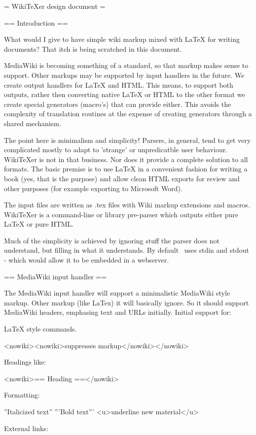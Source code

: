 = WikiTeXer design document =

== Introduction ==

What would I give to have simple wiki markup mixed with LaTeX for
writing documents? That itch is being scratched in this document. 

MediaWiki is becoming something of a standard, so that markup makes
sense to support. Other markups may be supported by input handlers in
the future. We create output handlers for LaTeX and HTML. This means,
to support both outputs, rather then converting native LaTeX or HTML
to the other format we create special generators (macro's) that can
provide either. This avoids the complexity of translation routines at the
expense of creating generators through a shared mechanism.

The point here is minimalism and simplicity! Parsers, in general, tend
to get very complicated mostly to adapt to 'strange' or unpredicatble
user behaviour. WikiTeXer is not in that business. Nor does it provide
a complete solution to all formats. The basic premise is to use LaTeX
in a convenient fashion for writing a book (yes, that is the purpose)
and allow clean HTML exports for review and other purposes (for
example exporting to Microsoft Word).

The input files are written as .tex files with Wiki markup extensions
and macros. WikiTeXer is a command-line or library pre-parser which
outputs either pure LaTeX or pure HTML.

Much of the simplicity is achieved by ignoring stuff the parser does
not understand, but filling in what it understands. By default
\wikitexer\ uses stdin and stdout - which would allow it to be
embedded in a webserver.


== MediaWiki input handler ==

The MediaWiki input handler will support a minimalistic MediaWiki style 
markup. Other markup (like LaTex) it will basically ignore. So it should
support MediaWiki headers, emphasing text and URLs initially. Initial 
support for:

LaTeX style commands.

<nowiki><nowiki>suppresses markup</nowiki></nowiki>

Headings like:

<nowiki>== Heading ==</nowiki>

Formatting:

''Italicized text''
'''Bold text'''
<u>underline new material</u>

External links:

